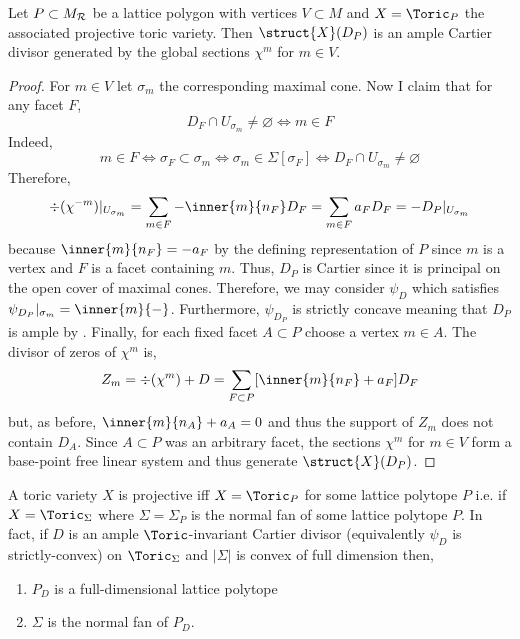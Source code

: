 \begin{proposition} \label{polytope_div_ample}
Let $P \subset M_{\mathcal{R}}$ be a lattice polygon with vertices $V \subset M$ and $X = \Toric_P$ the associated projective toric variety. Then $\struct{X}(D_P)$ is an ample Cartier divisor generated by the global sections $\chi^m$ for $m \in V$.
\end{proposition}

\begin{proof}
For $m \in V$ let $\sigma_m$ the corresponding maximal cone. Now I claim that for any facet $F$,
\[ D_F \cap U_{\sigma_m} \neq \varnothing \iff m \in F \]
Indeed,
\[ m \in F \iff \sigma_F \subset \sigma_m \iff \sigma_m \in \Sigma[\sigma_F] \iff D_F \cap U_{\sigma_m} \neq \varnothing \]
Therefore,
\[ \div{(\chi^{-m})} |_{U_{\sigma_m}} = \sum_{m \in F} - \inner{m}{n_F} D_F = \sum_{m \in F} a_F D_F  = - D_P |_{U_{\sigma_m}} \]
because $\inner{m}{n_F} = - a_F$ by the defining representation of $P$ since $m$ is a vertex and $F$ is a facet containing $m$.
Thus, $D_P$ is Cartier since it is principal on the open cover of maximal cones.  Therefore, we may consider $\psi_D$ which satisfies $\psi_{D_P} |_{\sigma_m} = \inner{m}{-}$. Furthermore, $\psi_{D_P}$ is strictly concave meaning that $D_P$ is ample by \cite[Thm. 6.1.15]{cox}. Finally, for each fixed facet $A \subset P$ choose a vertex $m \in A$. The divisor of zeros of $\chi^m$ is,
\[ Z_m = \div{(\chi^m)} + D = \sum_{F \subset P} [\inner{m}{n_F} + a_F] D_F \]
but, as before, $\inner{m}{n_A} + a_A = 0$ and thus the support of $Z_m$ does not contain $D_A$. Since $A \subset P$ was an arbitrary facet, the sections $\chi^m$ for $m \in V$ form a base-point free linear system and thus generate $\struct{X}(D_P)$.
\end{proof}

\begin{theorem} \label{projective_normal_fan}
A toric variety $X$ is projective iff $X = \Toric_P$ for some lattice polytope $P$ i.e. if $X = \Toric_\Sigma$ where $\Sigma = \Sigma_P$ is the normal fan of some lattice polytope $P$. In fact, if $D$ is an ample $\Toric$-invariant Cartier divisor (equivalently $\psi_D$ is strictly-convex) on $\Toric_\Sigma$ and $|\Sigma|$ is convex of full dimension then,
\begin{enumerate}
\item $P_D$ is a full-dimensional lattice polytope
\item $\Sigma$ is the normal fan of $P_D$. 
\end{enumerate}
\end{theorem}

